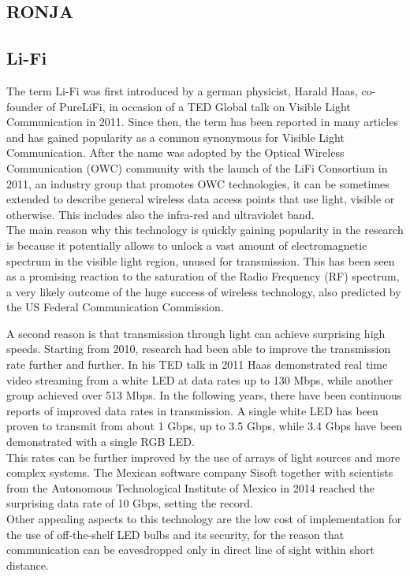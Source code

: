 \subsection{RONJA}

\subsection{Li-Fi}
The term Li-Fi was first introduced by a german physicist, Harald Haas, co-founder of PureLiFi, in occasion of a TED Global talk on Visible Light Communication in 2011. \cite{tedtalk}
Since then, the term has been reported in many articles and has gained popularity as a common synonymous for Visible Light Communication.
After the name was adopted by the Optical Wireless Communication (OWC) community with the launch of the LiFi Consortium in 2011, an industry group that promotes OWC technologies, it can be sometimes extended to describe general wireless data access points that use light, visible or otherwise.
This includes also the infra-red and ultraviolet band.\\

The main reason why this technology is quickly gaining popularity in the research is because it potentially allows to unlock a vast amount of electromagnetic spectrum in the visible light region, unused for transmission.\cite{haas1}
This has been seen as a promising reaction to the saturation of the Radio Frequency (RF) spectrum, a very likely outcome of the huge success of wireless technology, also predicted by the US Federal Communication Commission\cite{crisis}. 

A second reason is that transmission through light can achieve surprising high speeds.
Starting from 2010, research had been able to improve the transmission rate further and further.
In his TED talk in 2011 Haas demonstrated real time video streaming from a white LED at data rates up to 130 Mbps\cite{tedtalk}, while another group achieved over 513 Mbps\cite{500Mbps}.
In the following years, there have been continuous reports of improved data rates in transmission.
A single white LED has been proven to transmit from about 1 Gbps\cite{1Gbps}, up to 3.5 Gbps\cite{3.5Gbps}, while 3.4 Gbps have been demonstrated with a single RGB LED\cite{3.4Gbps}.\\
This rates can be further improved by the use of arrays of light sources and more complex systems.
The Mexican software company Sisoft together with scientists from the Autonomous Technological
Institute of Mexico in 2014 reached the surprising data rate of 10 Gbps, setting the record.\\
Other appealing aspects to this technology are the low cost of implementation for the use of off-the-shelf LED bulbs and its security, for the reason that communication can be eavesdropped only in direct line of sight within short distance.\\
 
